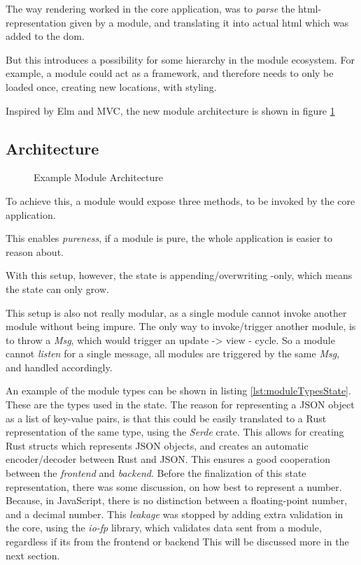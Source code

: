 The way rendering worked in the core application, was to \textit{parse} the
\gls{html}-representation given by a module, and translating it into actual
\gls{html} which was added to the \gls{dom}.


But this introduces a possibility for some hierarchy in the module ecosystem.
For example, a module could act as a framework, and therefore needs to only be
loaded once, creating new locations, with styling.

Inspired by Elm and MVC, the new module architecture is shown in figure
\ref{fig:moduleArchitecture}

\subsection{Architecture}
\begin{figure}
  \centering
  
  \caption{Example Module Architecture}
  \label{fig:moduleArchitecture}
\end{figure}

To achieve this, a module would expose three methods, to be invoked by the core
application.

This enables \textit{pureness}, if a module is pure, the whole application is
easier to reason about.

With this setup, however, the state is appending/overwriting -only, which means
the state can only grow.

This setup is also not really modular, as a single module cannot invoke another
module without being impure. The only way to invoke/trigger another module, is
to throw a \textit{Msg}, which would trigger an update -> view - cycle. So
a module cannot \textit{listen} for a single message, all modules are triggered
by the same \textit{Msg}, and handled accordingly.

An example of the module types can be shown in listing
\ref{lst:moduleTypesState}. These are the types used in the state. The reason
for representing a JSON object as a list of key-value pairs, is that this could
be easily translated to a Rust representation of the same type, using the
\textit{Serde} crate. This allows for creating Rust structs which represents
JSON objects, and creates an automatic encoder/decoder between Rust and JSON.
This ensures a good cooperation between the \textit{frontend} and
\textit{backend}.
Before the finalization of this state representation, there was some
discussion, on how best to represent a number. Because, in JavaScript, there is
no distinction between a floating-point number, and a decimal number. This
\textit{leakage} was stopped by adding extra validation in the core, using the
\textit{io-fp} library, which validates data sent from a module, regardless if
its from the frontend or backend This will be discussed more in the next
section.

